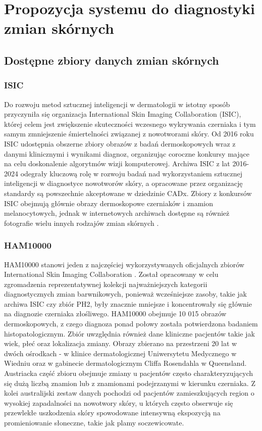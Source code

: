 
\def\filename{rozdzial3}
\chapter{Propozycja systemu do diagnostyki zmian skórnych}

\section{Dostępne zbiory danych zmian skórnych}

\subsection{ISIC}
Do rozwoju metod sztucznej inteligencji w dermatologii w istotny sposób przyczyniła się organizacja International Skin Imaging Collaboration (ISIC), której celem jest zwiększenie skuteczności wczesnego wykrywania czerniaka i tym samym zmniejszenie śmiertelności związanej z nowotworami skóry.
Od 2016 roku ISIC udostępnia obszerne zbiory obrazów z badań dermoskopowych wraz z danymi klinicznymi i wynikami diagnoz, organizując coroczne konkursy mające na celu doskonalenie algorytmów wizji komputerowej.
Archiwa ISIC z lat 2016-2024 odegrały kluczową rolę w rozwoju badań nad wykorzystaniem sztucznej inteligencji w diagnostyce nowotworów skóry, a opracowane przez organizację standardy są powszechnie akceptowane w dziedzinie CADx.
Zbiory z konkursów ISIC obejmują głównie obrazy dermoskopowe czerniaków i znamion melanocytowych, jednak w internetowych archiwach dostępne są również fotografie wielu innych rodzajów zmian skórnych \cite{Li_Koban_Schenck_Giunta_Li_Sun_2022}.

\subsection{HAM10000}
HAM10000 stanowi jeden z najczęściej wykorzystywanych oficjalnych zbiorów International Skin Imaging Collaboration \cite{Li_Koban_Schenck_Giunta_Li_Sun_2022}.
Został opracowany w celu zgromadzenia reprezentatywnej kolekcji najważniejszych kategorii diagnostycznych zmian barwnikowych, ponieważ wcześniejsze zasoby, takie jak archiwa ISIC czy zbiór PH2, były znacznie mniejsze i koncentrowały się głównie na diagnozie czerniaka złośliwego.
HAM10000 obejmuje 10 015 obrazów dermoskopowych, z czego diagnoza ponad połowy została potwierdzona badaniem histopatologicznym.
Zbiór uwzględnia również dane kliniczne pacjentów takie jak wiek, płeć oraz lokalizacja zmiany.
Obrazy zbierano na przestrzeni 20 lat w dwóch ośrodkach - w klinice dermatologicznej Uniwersytetu Medycznego w Wiedniu oraz w gabinecie dermatologicznym Cliffa Rosendahla w Queensland.
Austriacka część zbioru obejmuje zmiany u pacjentów często charakteryzujących się dużą liczbą znamion lub z znamionami podejrzanymi w kierunku czerniaka.
Z kolei australijski zestaw danych pochodzi od pacjentów zamieszkujących region o wysokiej zapadalności na nowotwory skóry, u których często obserwuje się przewlekłe uszkodzenia skóry spowodowane intensywną ekspozycją na promieniowanie słoneczne, takie jak plamy soczewicowate.

